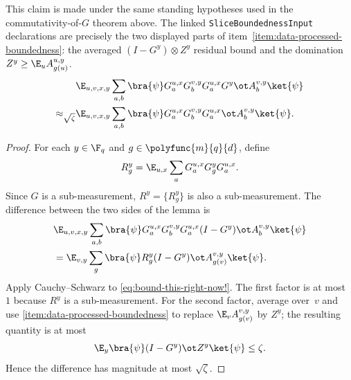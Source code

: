 \begin{lemma}\label{clm:g-comm-stability}
	\leanok
	This claim is made under the same standing hypotheses used in the
	commutativity-of-$G$ theorem above.  The linked
	\texttt{SliceBoundednessInput} declarations are precisely the two displayed
	parts of item~\ref{item:data-processed-boundedness}: the averaged
	\((I-G^y)\otimes Z^y\) residual bound and the domination
	\(Z^y\ge \E_u A^{u,y}_{g(u)}\).
	\begin{align}
		                       & \E_{u,v,x,y} \sum_{a,b}
		\bra{\psi} G_a^{u,x} G_b^{v,y} G_a^{u,x} G^y \ot A_b^{v,y} \ket{\psi}
		\label{eq:g-comm-stab1}                          \\
		\approx_{\sqrt{\zeta}} &
		\E_{u,v,x,y} \sum_{a,b}
		\bra{\psi} G_a^{u,x} G_b^{v,y} G_a^{u,x} \ot A_b^{v,y} \ket{\psi}.
		\nonumber
	\end{align}
\end{lemma}
\begin{proof}
	\leanok
	For each $y \in \F_q$ and $g \in \polyfunc{m}{q}{d}$, define
	\[
		R_g^y = \E_{u,x} \sum_a G_a^{u,x} G_g^y G_a^{u,x}.
	\]
	Since $G$ is a sub-measurement, $R^y=\{R_g^y\}$ is also a sub-measurement. The difference between the two sides of the lemma is
	\begin{align}
		 & \E_{u,v,x,y} \sum_{a,b}
		\bra{\psi} G_a^{u,x} G_b^{v,y} G_a^{u,x} (I-G^y) \ot A_b^{v,y} \ket{\psi}\nonumber \\
		 & = \E_{v,y} \sum_g
		\bra{\psi} R_g^y (I-G^y) \ot A_{g(v)}^{v,y} \ket{\psi}.
		\label{eq:bound-this-right-now!}
	\end{align}
	Apply Cauchy--Schwarz to \ref{eq:bound-this-right-now!}. The first factor is at most~$1$ because $R^y$ is a sub-measurement. For the second factor, average over~$v$ and use \ref{item:data-processed-boundedness} to replace $\E_v A_{g(v)}^{v,y}$ by $Z^y$; the resulting quantity is at most
	\[
		\E_y \bra{\psi} (I-G^y) \ot Z^y \ket{\psi} \le \zeta.
	\]
	Hence the difference has magnitude at most $\sqrt{\zeta}$.
\end{proof}

